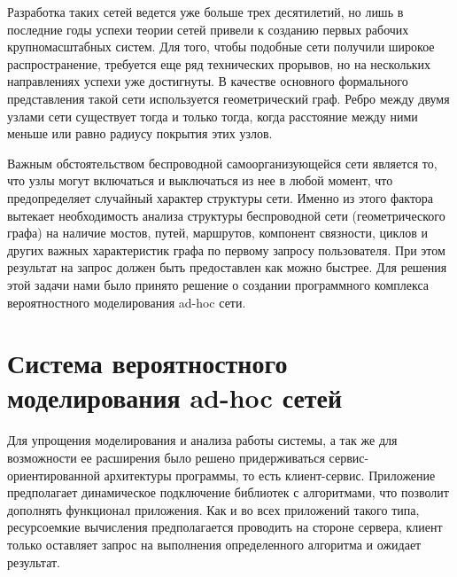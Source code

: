 Разработка таких сетей ведется уже больше трех десятилетий, но лишь в последние годы успехи теории сетей привели к созданию первых рабочих крупномасштабных систем. Для того, чтобы подобные сети получили широкое распространение, требуется еще ряд технических прорывов, но на нескольких направлениях успехи уже достигнуты. В качестве основного формального представления такой сети используется геометрический граф. Ребро между двумя узлами сети существует тогда и только тогда, когда расстояние между ними меньше или равно радиусу покрытия этих узлов.

Важным обстоятельством беспроводной самоорганизующейся сети является то, что узлы могут включаться и выключаться из нее в любой момент, что предопределяет случайный характер структуры сети. Именно из этого фактора вытекает необходимость анализа структуры беспроводной сети (геометрического графа) на наличие мостов, путей, маршрутов, компонент связности, циклов и других важных характеристик графа по первому запросу пользователя. При этом результат на запрос должен быть предоставлен как можно быстрее. Для решения этой задачи нами было принято решение о создании программного комплекса вероятностного моделирования ad-hoc сети.

\section{Система вероятностного моделирования ad-hoc сетей}

Для упрощения моделирования и анализа работы системы, а так же для возможности ее расширения было решено придерживаться сервис-ориентированной архитектуры программы, то есть клиент-сервис. Приложение предполагает динамическое подключение библиотек с алгоритмами, что позволит дополнять функционал приложения. Как и во всех приложений такого типа, ресурсоемкие вычисления предполагается проводить на стороне сервера, клиент только оставляет запрос на выполнения определенного алгоритма и ожидает результат.

